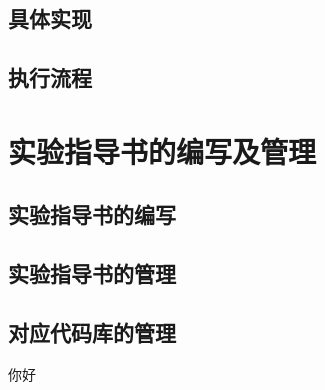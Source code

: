 \subsection{具体实现}

\subsection{执行流程}

\section{实验指导书的编写及管理}

\subsection{实验指导书的编写}

\subsection{实验指导书的管理}

\subsection{对应代码库的管理}
你好
